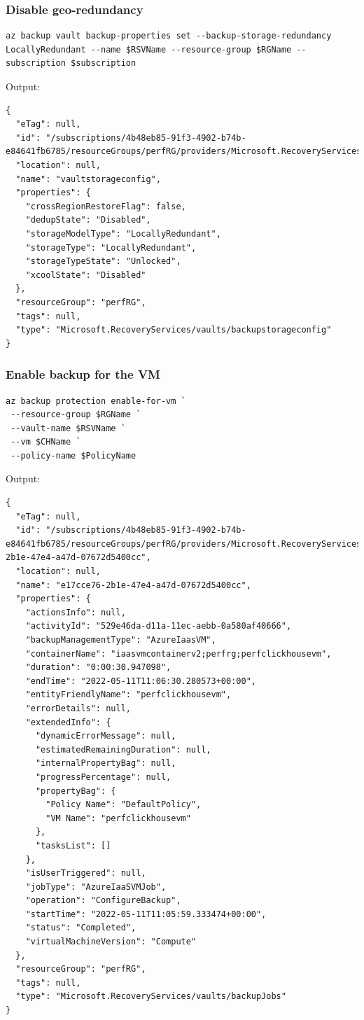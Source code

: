 \subsubsection{Disable geo-redundancy}
\label{sec:org5e6a978}
\begin{verbatim}
az backup vault backup-properties set --backup-storage-redundancy LocallyRedundant --name $RSVName --resource-group $RGName --subscription $subscription
\end{verbatim}

Output:
\begin{verbatim}
{
  "eTag": null,
  "id": "/subscriptions/4b48eb85-91f3-4902-b74b-e84641fb6785/resourceGroups/perfRG/providers/Microsoft.RecoveryServices/vaults/perfRSV/backupstorageconfig/vaultstorageconfig",
  "location": null,
  "name": "vaultstorageconfig",
  "properties": {
    "crossRegionRestoreFlag": false,
    "dedupState": "Disabled",
    "storageModelType": "LocallyRedundant",
    "storageType": "LocallyRedundant",
    "storageTypeState": "Unlocked",
    "xcoolState": "Disabled"
  },
  "resourceGroup": "perfRG",
  "tags": null,
  "type": "Microsoft.RecoveryServices/vaults/backupstorageconfig"
}
\end{verbatim}
\subsubsection{Enable backup for the VM}
\label{sec:org6d56370}
\begin{verbatim}
az backup protection enable-for-vm `
 --resource-group $RGName `
 --vault-name $RSVName `
 --vm $CHName `
 --policy-name $PolicyName
\end{verbatim}

Output:
\begin{verbatim}
{
  "eTag": null,
  "id": "/subscriptions/4b48eb85-91f3-4902-b74b-e84641fb6785/resourceGroups/perfRG/providers/Microsoft.RecoveryServices/vaults/perfRSV/backupJobs/e17cce76-2b1e-47e4-a47d-07672d5400cc",
  "location": null,
  "name": "e17cce76-2b1e-47e4-a47d-07672d5400cc",
  "properties": {
    "actionsInfo": null,
    "activityId": "529e46da-d11a-11ec-aebb-0a580af40666",
    "backupManagementType": "AzureIaasVM",
    "containerName": "iaasvmcontainerv2;perfrg;perfclickhousevm",
    "duration": "0:00:30.947098",
    "endTime": "2022-05-11T11:06:30.280573+00:00",
    "entityFriendlyName": "perfclickhousevm",
    "errorDetails": null,
    "extendedInfo": {
      "dynamicErrorMessage": null,
      "estimatedRemainingDuration": null,
      "internalPropertyBag": null,
      "progressPercentage": null,
      "propertyBag": {
        "Policy Name": "DefaultPolicy",
        "VM Name": "perfclickhousevm"
      },
      "tasksList": []
    },
    "isUserTriggered": null,
    "jobType": "AzureIaaSVMJob",
    "operation": "ConfigureBackup",
    "startTime": "2022-05-11T11:05:59.333474+00:00",
    "status": "Completed",
    "virtualMachineVersion": "Compute"
  },
  "resourceGroup": "perfRG",
  "tags": null,
  "type": "Microsoft.RecoveryServices/vaults/backupJobs"
}
\end{verbatim}

